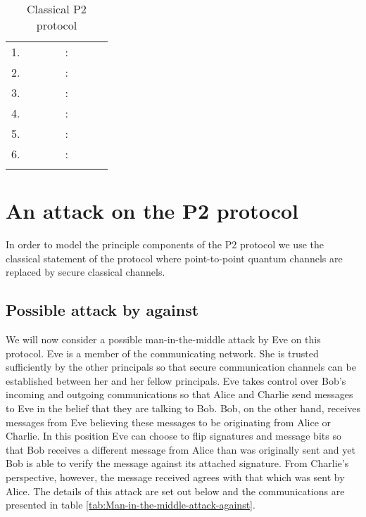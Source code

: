 \documentclass[english]{article}
\providecommand{\tabularnewline}{\\}
\begin{document}
\begin{table}
\begin{tabular}{llllllll}
1. &  &  &  & : &  &  & \tabularnewline
2. &  &  &  & : &  &  & \tabularnewline
3. &  &  &  & : &  &  & \tabularnewline
4. &  &  &  & : &  &  & \tabularnewline
5. &  &  &  & : &  &  & \tabularnewline
6. &  &  &  & : &  &  & \tabularnewline
 &  &  &  &  &  &  & \tabularnewline
\end{tabular}

\caption{\label{tab:Classical-P2-protocol}Classical P2 protocol}
\end{table}



\section{An attack on the P2 protocol}

In order to model the principle components of the P2 protocol we use
the classical statement of the protocol where point-to-point quantum
channels are replaced by secure classical channels. 


\subsection{Possible attack by  against }

We will now consider a possible man-in-the-middle attack by Eve on
this protocol. Eve  is a member of the communicating
network. She is trusted sufficiently by the other principals so that
secure communication channels can be established between her and her
fellow principals. Eve takes control over Bob's incoming and outgoing
communications so that Alice and Charlie send messages to Eve in the
belief that they are talking to Bob. Bob, on the other hand, receives
messages from Eve believing these messages to be originating from
Alice or Charlie. In this position Eve can choose to flip signatures
and message bits so that Bob receives a different message from Alice
than was originally sent and yet Bob is able to verify the message
against its attached signature. From Charlie's perspective, however,
the message received agrees with that which was sent by Alice. The
details of this attack are set out below and the communications are
presented in table \ref{tab:Man-in-the-middle-attack-against}.
\end{document}
